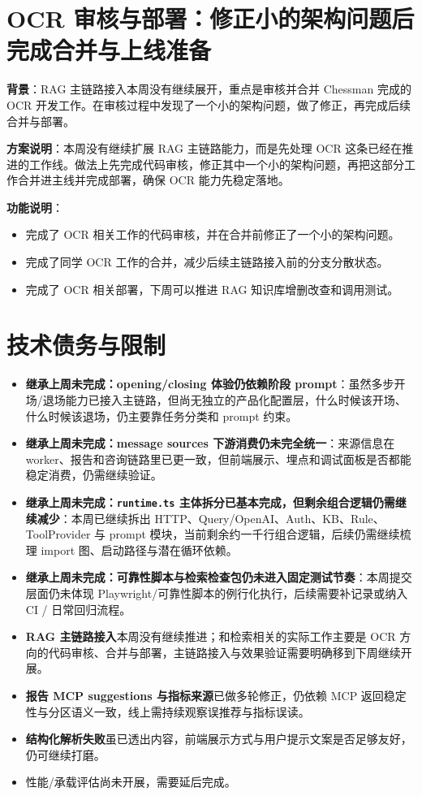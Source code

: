 \documentclass[UTF8]{ctexart}
\begin{document}
\section{OCR 审核与部署：修正小的架构问题后完成合并与上线准备}

\textbf{背景}：RAG 主链路接入本周没有继续展开，重点是审核并合并 Chessman 完成的 OCR 开发工作。在审核过程中发现了一个小的架构问题，做了修正，再完成后续合并与部署。

\textbf{方案说明}：本周没有继续扩展 RAG 主链路能力，而是先处理 OCR 这条已经在推进的工作线。做法上先完成代码审核，修正其中一个小的架构问题，再把这部分工作合并进主线并完成部署，确保 OCR 能力先稳定落地。

\textbf{功能说明}：
\begin{itemize}
\item 完成了 OCR 相关工作的代码审核，并在合并前修正了一个小的架构问题。
\item 完成了同学 OCR 工作的合并，减少后续主链路接入前的分支分散状态。
\item 完成了 OCR 相关部署，下周可以推进 RAG 知识库增删改查和调用测试。
\end{itemize}

\section{技术债务与限制}

\begin{itemize}
\item \textbf{继承上周未完成：opening/closing 体验仍依赖阶段 prompt}：虽然多步开场/退场能力已接入主链路，但尚无独立的产品化配置层，什么时候该开场、什么时候该退场，仍主要靠任务分类和 prompt 约束。
\item \textbf{继承上周未完成：message sources 下游消费仍未完全统一}：来源信息在 worker、报告和咨询链路里已更一致，但前端展示、埋点和调试面板是否都能稳定消费，仍需继续验证。
\item \textbf{继承上周未完成：\texttt{runtime.ts} 主体拆分已基本完成，但剩余组合逻辑仍需继续减少}：本周已继续拆出 HTTP、Query/OpenAI、Auth、KB、Rule、ToolProvider 与 prompt 模块，当前剩余约一千行组合逻辑，后续仍需继续梳理 import 图、启动路径与潜在循环依赖。
\item \textbf{继承上周未完成：可靠性脚本与检索检查包仍未进入固定测试节奏}：本周提交层面仍未体现 Playwright/可靠性脚本的例行化执行，后续需要补记录或纳入 CI / 日常回归流程。
\item \textbf{RAG 主链路接入}本周没有继续推进；和检索相关的实际工作主要是 OCR 方向的代码审核、合并与部署，主链路接入与效果验证需要明确移到下周继续开展。
\item \textbf{报告 MCP suggestions 与指标来源}已做多轮修正，仍依赖 MCP 返回稳定性与分区语义一致，线上需持续观察误推荐与指标误读。
\item \textbf{结构化解析失败}虽已透出内容，前端展示方式与用户提示文案是否足够友好，仍可继续打磨。
\item 性能/承载评估尚未开展，需要延后完成。
\end{itemize}
\end{document}
